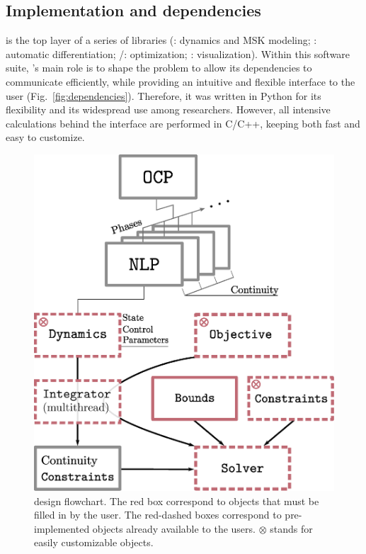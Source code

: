 \subsection{Implementation and dependencies}
\bioptim is the top layer of a series of libraries (\biorbd: dynamics and MSK modeling; \casadi: automatic differentiation; \ipopt/\acados: optimization; \bioviz: visualization).
Within this software suite, \bioptim 's main role is to shape the problem to allow its dependencies to communicate efficiently, while providing an intuitive and flexible interface to the user (Fig.~\ref{fig:dependencies}).
Therefore, it was written in Python for its flexibility and its widespread use among researchers.
However, all intensive calculations behind the interface are performed in C/C++, keeping \bioptim both fast and easy to customize.

\begin{figure}[t!]
\centering
\includegraphics[width=0.9\columnwidth]{figures/design.eps}
\caption{\bioptim design flowchart. The red box correspond to objects that must be filled in by the user. The red-dashed boxes correspond to pre-implemented objects already available to the users. $\otimes$ stands for easily customizable objects.}
\label{fig:flowchart}
\vspace*{-0.5cm}
\end{figure}


